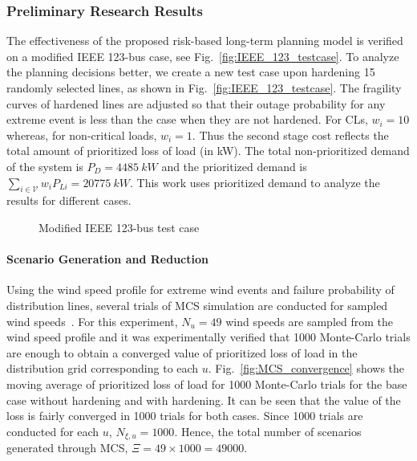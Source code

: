\subsubsection{Preliminary Research Results}
The effectiveness of the proposed risk-based long-term planning model is verified on a modified IEEE 123-bus case, see Fig.~\ref{fig:IEEE_123_testcase}. To analyze the planning decisions better, we create a new test case upon hardening 15 randomly selected lines, as shown in Fig.~\ref{fig:IEEE_123_testcase}. The fragility curves of hardened lines are adjusted so that their outage probability for any extreme event is less than the case when they are not hardened. For CLs, $w_i = 10$ whereas, for non-critical loads, $w_i = 1$. Thus the second stage cost reflects the total amount of prioritized loss of load (in kW). The total non-prioritized demand of the system is $P_D = 4485~kW$ and the prioritized demand is $\sum_{i\in\mathcal{V}}{w_iP_{Li}} = 20775~kW$. This work uses prioritized demand to analyze the results for different cases.

\begin{figure}[t]
    \centering
    \caption{Modified IEEE 123-bus test case}
    \label{fig:IEEE_123_CL_update}
\end{figure}

\paragraph{Scenario Generation and Reduction}
Using the wind speed profile for extreme wind events and failure probability of distribution lines, several trials of MCS simulation are conducted for sampled wind speeds~\cite{7036086}. For this experiment, $N_u=49$ wind speeds are sampled from the wind speed profile and it was experimentally verified that 1000 Monte-Carlo trials are enough to obtain a converged value of prioritized loss of load in the distribution grid corresponding to each $u$. Fig.~\ref{fig:MCS_convergence} shows the moving average of prioritized loss of load for 1000 Monte-Carlo trials for the base case without hardening and with hardening. It can be seen that the value of the loss is fairly converged in 1000 trials for both cases. Since 1000 trials are conducted for each $u$, $N_{\xi,u} = 1000$. Hence, the total number of scenarios generated through MCS, $\Xi = 49 \times 1000 = 49000$. 

